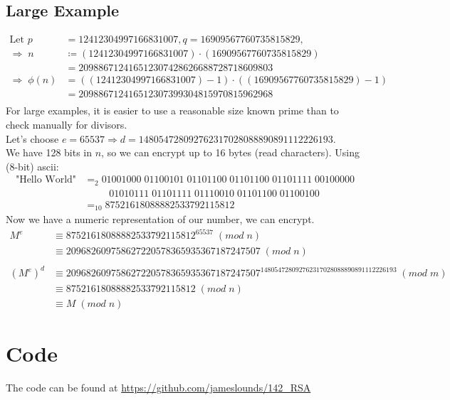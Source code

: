 \documentclass{article}
\begin{document}
\subsection{Large Example}
\begin{align*}
    \text{Let }     p       & = 12412304997166831007, q = 16909567760735815829,               \\
    \Rightarrow\;   n       & \coloneqq (12412304997166831007) \cdot (16909567760735815829)   \\
                            & = 209886712416512307428626688728718609803                       \\
    \Rightarrow \;  \phi(n) & = ((12412304997166831007) -1) \cdot ((16909567760735815829) -1) \\
                            & = 209886712416512307399304815970815962968                       \\
\end{align*}
For large examples, it is easier to use a reasonable size
known prime than to check manually for divisors. \\
Let's choose $e = 65537 \Rightarrow d = 148054728092762317028088890891112226193$. \\
We have 128 bits in $n$, so we can encrypt up to 16 bytes (read characters).
Using (8-bit) ascii:
\begin{align*}
    \text{"Hello World"} & =_{2} 01001000\;01100101\;01101100\;01101100\;01101111\;00100000   \\
                         & \;\;\;\;\;\;\;\;\;01010111\;01101111\;01110010\;01101100\;01100100 \\
                         & =_{10} 87521618088882533792115812
\end{align*}
Now we have a numeric representation of our number, we can encrypt.
\begin{align*}
    M^e     & \equiv 87521618088882533792115812^{65537} \; (mod \; n)                                                 \\
            & \equiv 209682609758627220578365935367187247507\; (mod \; n)                                             \\
    \\
    (M^e)^d & \equiv 209682609758627220578365935367187247507 ^{148054728092762317028088890891112226193} \; (mod \; m) \\
            & \equiv 87521618088882533792115812 \; (mod \; n)                                                         \\
            & \equiv M \; (mod \; n)
\end{align*}
\newpage

\section{Code}
The code can be found at \url{https://github.com/jameslounds/142_RSA}
\end{document}
